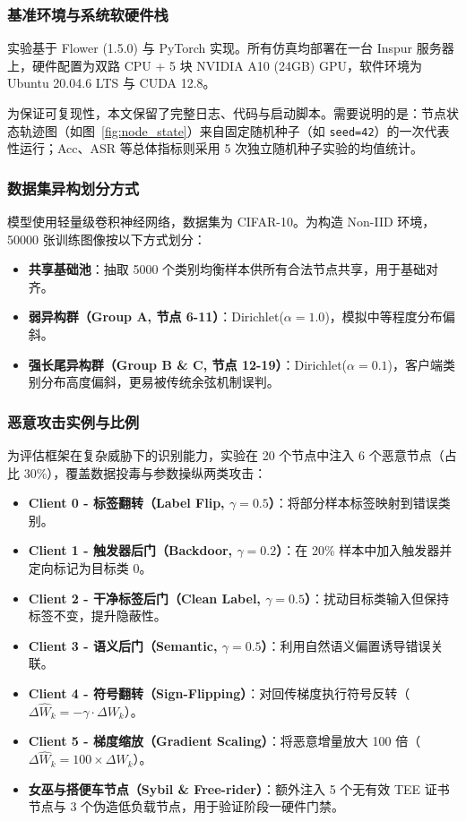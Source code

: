 \documentclass[11pt, a4paper, UTF8, fontset=fandol]{ctexart}
\begin{document}
\subsubsection{基准环境与系统软硬件栈}
实验基于 Flower (1.5.0) 与 PyTorch 实现。所有仿真均部署在一台 Inspur 服务器上，硬件配置为双路 CPU + 5 块 NVIDIA A10 (24GB) GPU，软件环境为 Ubuntu 20.04.6 LTS 与 CUDA 12.8。

为保证可复现性，本文保留了完整日志、代码与启动脚本。需要说明的是：节点状态轨迹图（如图~\ref{fig:node_state}）来自固定随机种子（如 \texttt{seed=42}）的一次代表性运行；Acc、ASR 等总体指标则采用 5 次独立随机种子实验的均值统计。

\subsubsection{数据集异构划分方式}
模型使用轻量级卷积神经网络，数据集为 CIFAR-10。为构造 Non-IID 环境，50000 张训练图像按以下方式划分：
\begin{itemize}
    \item \textbf{共享基础池}：抽取 5000 个类别均衡样本供所有合法节点共享，用于基础对齐。
    \item \textbf{弱异构群（Group A, 节点 6-11）}：Dirichlet($\alpha=1.0$)，模拟中等程度分布偏斜。
    \item \textbf{强长尾异构群（Group B \& C, 节点 12-19）}：Dirichlet($\alpha=0.1$)，客户端类别分布高度偏斜，更易被传统余弦机制误判。
\end{itemize}

\subsubsection{恶意攻击实例与比例}
为评估框架在复杂威胁下的识别能力，实验在 20 个节点中注入 6 个恶意节点（占比 30\%），覆盖数据投毒与参数操纵两类攻击：
\begin{itemize}
    \item \textbf{Client 0 - 标签翻转（Label Flip, $\gamma=0.5$）}：将部分样本标签映射到错误类别。
    \item \textbf{Client 1 - 触发器后门（Backdoor, $\gamma=0.2$）}：在 20\% 样本中加入触发器并定向标记为目标类 $0$。
    \item \textbf{Client 2 - 干净标签后门（Clean Label, $\gamma=0.5$）}：扰动目标类输入但保持标签不变，提升隐蔽性。
    \item \textbf{Client 3 - 语义后门（Semantic, $\gamma=0.5$）}：利用自然语义偏置诱导错误关联。
    \item \textbf{Client 4 - 符号翻转（Sign-Flipping）}：对回传梯度执行符号反转（$\Delta \widehat{W}_k = - \gamma \cdot \Delta W_k$）。
    \item \textbf{Client 5 - 梯度缩放（Gradient Scaling）}：将恶意增量放大 100 倍（$\Delta \widehat{W}_k = 100 \times \Delta W_k$）。
    \item \textbf{女巫与搭便车节点（Sybil \& Free-rider）}：额外注入 5 个无有效 TEE 证书节点与 3 个伪造低负载节点，用于验证阶段一硬件门禁。
\end{itemize}
\end{document}
